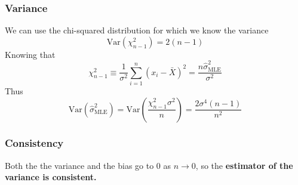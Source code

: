 \documentclass{article}
\DeclareMathOperator{\E}{\mathbb{E}}
\numberwithin{equation}{section}
\newcommand{\mle}[1]{\hat{#1}_{\text{MLE}}}
\begin{document}
\subsubsection{Variance}
We can use the chi-squared distribution for which we know the variance
\[
        \text{Var}(\chi^2_{n -1}) = 2(n - 1)
\]
Knowing that
\[
        \chi^2_{n -1} \equiv \frac{1}{\sigma^2}\sum_{i = 1}^n (x_i -\bar{X})^2 =
        \frac{n\mle{\sigma}^2}{\sigma^2}
\]
Thus
\[
\text{Var}(\mle{\sigma}^2) = \text{Var}\left( \frac{\chi^2_{n -1}\sigma^2}{n} \right)   
= \frac{2\sigma^4(n - 1)}{n^2}
\]

\subsubsection{Consistency}
Both the the variance and the bias go to 0 as $n \rightarrow 0$, so the \textbf{estimator of 
the variance is consistent.}
\end{document}
